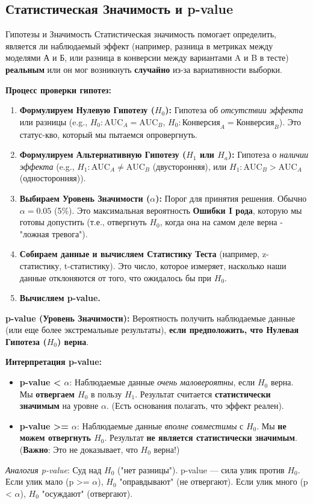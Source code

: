 \subsection{Статистическая Значимость и p-value}

\begin{textbox}{Гипотезы и Значимость}
Статистическая значимость помогает определить, является ли наблюдаемый эффект (например, разница в метриках между моделями А и Б, или разница в конверсии между вариантами A и B в тесте) \textbf{реальным} или он мог возникнуть \textbf{случайно} из-за вариативности выборки.

\textbf{Процесс проверки гипотез:}
\begin{enumerate}
    \item \textbf{Формулируем Нулевую Гипотезу ($H_0$):} Гипотеза об \textit{отсутствии эффекта} или разницы (e.g., $H_0: \text{AUC}_A = \text{AUC}_B$, $H_0: \text{Конверсия}_A = \text{Конверсия}_B$). Это статус-кво, который мы пытаемся опровергнуть.
    \item \textbf{Формулируем Альтернативную Гипотезу ($H_1$ или $H_a$):} Гипотеза о \textit{наличии эффекта} (e.g., $H_1: \text{AUC}_A \neq \text{AUC}_B$ (двусторонняя), или $H_1: \text{AUC}_B > \text{AUC}_A$ (односторонняя)).
    \item \textbf{Выбираем Уровень Значимости ($\alpha$):} Порог для принятия решения. Обычно $\alpha = 0.05$ (5\%). Это максимальная вероятность \textbf{Ошибки I рода}, которую мы готовы допустить (т.е., отвергнуть $H_0$, когда она на самом деле верна - "ложная тревога").
    \item \textbf{Собираем данные и вычисляем Статистику Теста} (например, z-статистику, t-статистику). Это число, которое измеряет, насколько наши данные отклоняются от того, что ожидалось бы при $H_0$.
    \item \textbf{Вычисляем p-value.}
\end{enumerate}

\textbf{p-value (Уровень Значимости):}
Вероятность получить наблюдаемые данные (или еще более экстремальные результаты), \textbf{если предположить, что Нулевая Гипотеза ($H_0$) верна}.

\textbf{Интерпретация p-value:}
\begin{itemize}
    \item \textbf{p-value < $\alpha$}: Наблюдаемые данные \textit{очень маловероятны}, если $H_0$ верна. Мы \textbf{отвергаем $H_0$} в пользу $H_1$. Результат считается \textbf{статистически значимым} на уровне $\alpha$. (Есть основания полагать, что эффект реален).
    \item \textbf{p-value >= $\alpha$}: Наблюдаемые данные \textit{вполне совместимы} с $H_0$. Мы \textbf{не можем отвергнуть $H_0$}. Результат \textbf{не является статистически значимым}. (\textbf{Важно}: Это не доказывает, что $H_0$ верна!)
\end{itemize}
\textit{Аналогия p-value}: Суд над $H_0$ ("нет разницы"). p-value — сила улик против $H_0$. Если улик мало (p >= $\alpha$), $H_0$ "оправдывают" (не отвергают). Если улик много (p < $\alpha$), $H_0$ "осуждают" (отвергают).


\end{textbox}
